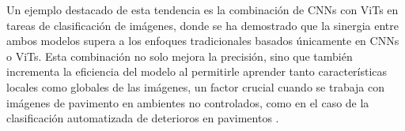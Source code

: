 Un ejemplo destacado de esta tendencia es la combinación de CNNs con ViTs en tareas de clasificación de imágenes, donde se ha demostrado que la sinergia entre ambos modelos supera a los enfoques tradicionales basados únicamente en CNNs o ViTs. Esta combinación no solo mejora la precisión, sino que también incrementa la eficiencia del modelo al permitirle aprender tanto características locales como globales de las imágenes, un factor crucial cuando se trabaja con imágenes de pavimento en ambientes no controlados, como en el caso de la clasificación automatizada de deterioros en pavimentos \parencite{app13095521}.


